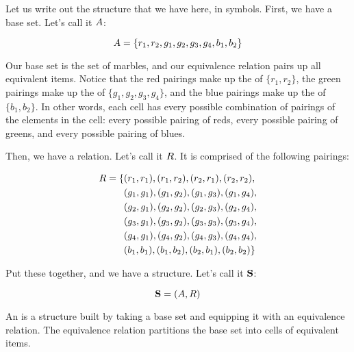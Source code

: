 \documentclass[../../../main.tex]{subfiles}
\begin{document}
Let us write out the structure that we have here, in symbols. First, we have a base set. Let's call it $A$:

\begin{equation*}
  A = \{ r_{1}, r_{2}, g_{1}, g_{2}, g_{3}, g_{4}, b_{1}, b_{2} \}
\end{equation*}

\begin{aside}
  \begin{remark}
    Our base set is the set of marbles, and our equivalence relation pairs up all equivalent items. Notice that the red pairings make up the  of $\{ r_{1}, r_{2} \}$, the green pairings make up the  of $\{ g_{1}, g_{2}, g_{3}, g_{4} \}$, and the blue pairings make up the  of $\{ b_{1}, b_{2} \}$. In other words, each cell has every possible combination of pairings of the elements in the cell: every possible pairing of reds, every possible pairing of greens, and every possible pairing of blues.
  \end{remark}
\end{aside}

Then, we have a relation. Let's call it $R$. It is comprised of the following pairings:

\begin{align*}
  R = \{ &(r_{1}, r_{1}), (r_{1}, r_{2}), (r_{2}, r_{1}), (r_{2}, r_{2}), \\
             &(g_{1}, g_{1}), (g_{1}, g_{2}), (g_{1}, g_{3}), (g_{1}, g_{4}), \\
             &(g_{2}, g_{1}), (g_{2}, g_{2}), (g_{2}, g_{3}), (g_{2}, g_{4}), \\
             &(g_{3}, g_{1}), (g_{3}, g_{2}), (g_{3}, g_{3}), (g_{3}, g_{4}), \\
             &(g_{4}, g_{1}), (g_{4}, g_{2}), (g_{4}, g_{3}), (g_{4}, g_{4}), \\
             &(b_{1}, b_{1}), (b_{1}, b_{2}), (b_{2}, b_{1}), (b_{2}, b_{2}) \}
\end{align*}

Put these together, and we have a structure. Let's call it $\mathbf{S}$:

\begin{equation*}
  \mathbf{S} = (A, R)
\end{equation*}

\begin{terminology}
  An  is a structure built by taking a base set and equipping it with an equivalence relation. The equivalence relation partitions the base set into cells of equivalent items.
\end{terminology}
\end{document}
